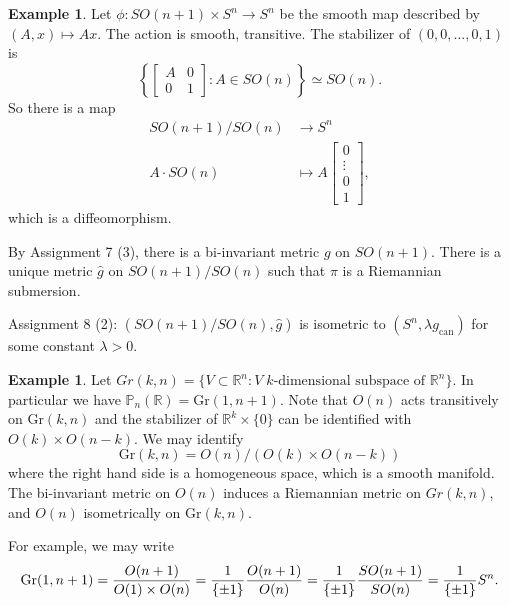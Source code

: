 \documentclass{amsart}
\numberwithin{equation}{section}
\theoremstyle{definition}
\newtheorem{example}[definition]{Example}
\theoremstyle{theorem}
\begin{document}
\begin{example}
Let $\phi : SO(n+1) \times S^n \to S^n$ be the smooth map described by $(A,x) \mapsto Ax$. The action is smooth, transitive. The stabilizer of $(0,0,\ldots, 0,1)$ is 
\[
\left\{\begin{bmatrix}
A & 0 \\ 0 & 1
\end{bmatrix} : A \in SO(n)\right\} \simeq SO(n).
\]
So there is a map 
\begin{align*}
SO(n+1)/SO(n) &\to S^n \\
A \cdot SO(n) &\mapsto A\left[\begin{array}{c}0\\ \vdots \\ 0\\1\end{array}\right],
\end{align*}
which is a diffeomorphism. 

By Assignment 7 (3), there is a bi-invariant metric $g$ on $SO(n+1)$. There is a unique metric $\hat{g}$ on $SO(n+1)/SO(n)$ such that $\pi$ is a Riemannian submersion. 

Assignment 8 (2): $(SO(n+1)/SO(n), \hat{g})$ is isometric to
$(S^n,\lambda g_\mathrm{can})$ for some constant $\lambda >0$.
\end{example}


\begin{example}
Let $Gr(k,n) = \{V \subset \mathbb{R}^n : V \; \text{$k$-dimensional subspace of $\mathbb{R}^n$}\}$.  In particular we have $\mathbb{P}_n(\mathbb{R}) = \text{Gr}(1, n+1)$. Note that $O(n)$ acts transitively on $\text{Gr}(k,n)$ and the stabilizer of $\mathbb{R}^k \times \{0\}$ can be identified with $O(k) \times O(n-k)$. We may identify 
\[
\text{Gr}(k,n) = O(n)/(O(k) \times O(n-k))
\]
where the right hand side is a homogeneous space, which is a smooth manifold.
The bi-invariant metric on $O(n)$ induces a Riemannian metric on $Gr(k,n)$,
and $O(n)$ isometrically on $\text{Gr}(k,n)$.

For example, we may write 
$$
\text{Gr}(1, n+1) = \frac{O(n+1)}{O(1) \times O(n)} \\
=  \frac{1}{\{\pm1\}} \frac{O(n+1)}{O(n)}  \\
= \frac{1}{\{\pm1\}} \frac{SO(n+1)}{SO(n)} \\
= \frac{1}{\{\pm1\}} S^n.
$$
\end{example}
\end{document}
